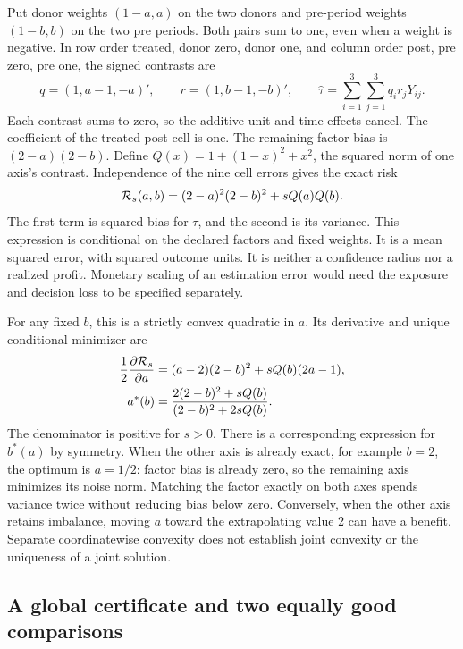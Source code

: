 Put donor weights $(1-a,a)$ on the two donors and pre-period weights
$(1-b,b)$ on the two pre periods. Both pairs sum to one, even when a weight
is negative. In row order treated, donor zero, donor one, and column order
post, pre zero, pre one, the signed contrasts are
\begin{equation}
 q=(1,a-1,-a)',\qquad r=(1,b-1,-b)',\qquad
 \widehat\tau=\sum_{i=1}^3\sum_{j=1}^3q_i r_jY_{ij}.
 \label{exec17:s6-joint-contrast}
\end{equation}
Each contrast sums to zero, so the additive unit and time effects cancel.
The coefficient of the treated post cell is one. The remaining factor bias
is $(2-a)(2-b)$. Define $Q(x)=1+(1-x)^2+x^2$, the squared norm of one
axis's contrast. Independence of the nine cell errors gives the exact risk
\begin{equation}
 {\cal R}_s(a,b)
  =(2-a)^2(2-b)^2+sQ(a)Q(b).
 \label{exec17:s6-joint-risk}
\end{equation}
The first term is squared bias for $\tau$, and the second is its variance.
This expression is conditional on the declared factors and fixed weights.
It is a mean squared error, with squared outcome units. It is neither a
confidence radius nor a realized profit. Monetary scaling of an estimation
error would need the exposure and decision loss to be specified separately.

For any fixed $b$, this is a strictly convex quadratic in $a$. Its derivative
and unique conditional minimizer are
\begin{align}
 \frac{1}{2}\frac{\partial{\cal R}_s}{\partial a}
  &=(a-2)(2-b)^2+sQ(b)(2a-1),\nonumber\\
 a^*(b)&=\frac{2(2-b)^2+sQ(b)}{(2-b)^2+2sQ(b)}.
 \label{exec17:s6-joint-conditional}
\end{align}
The denominator is positive for $s>0$. There is a corresponding expression
for $b^*(a)$ by symmetry. When the other axis is already exact, for example
$b=2$, the optimum is $a=1/2$: factor bias is already zero, so the remaining
axis minimizes its noise norm. Matching the factor exactly on both axes
spends variance twice without reducing bias below zero. Conversely, when
the other axis retains imbalance, moving $a$ toward the extrapolating value
2 can have a benefit. Separate coordinatewise convexity does not establish
joint convexity or the uniqueness of a joint solution.

\subsection{A global certificate and two equally good comparisons}

